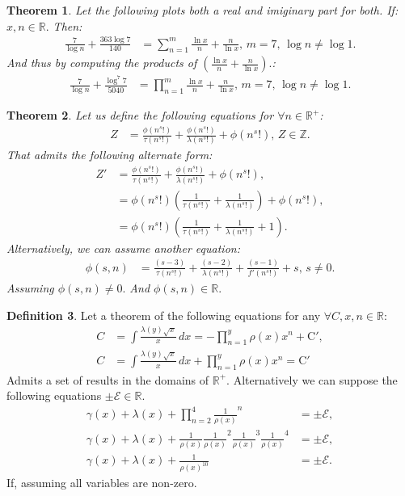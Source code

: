 \documentclass[10pt]{article}
\theoremstyle{plain}
\newtheorem{theorem}{Theorem}[section]
\theoremstyle{definition}
\newtheorem{definition}[theorem]{Definition}
\theoremstyle{remark}
\begin{document}
\begin{theorem}
	Let the following plots both a real and imiginary part for both. If: $x, n \in \mathbb{R}.$ Then:
	\begin{align*}
		\frac{7}{\log n} + \frac{363 \log 7}{140} &= \sum_{n=1}^{m} \frac{\ln x}{n} + \frac{n}{\ln x}, \, m = 7, \, \log n \neq \log 1.
	\end{align*}
	And thus by computing the products of $(\frac{\ln x}{n} + \frac{n}{\ln x}).$:
	\begin{align*}
		\frac{7}{\log n} + \frac{\log^{7} 7}{5040} &= \prod_{n=1}^{m} \frac{\ln x}{n} + \frac{n}{\ln x}, \, m = 7, \, \log n \neq \log 1.
	\end{align*}
\end{theorem}

\begin{theorem}
	Let us define the following equations for $\forall n \in \mathbb{R}^{+}$:
	\begin{align*}
		Z &= \frac{\phi(n^{s}!)}{\tau(n^{s}!)} + \frac{\phi(n^{s}!)}{\lambda(n^{s}!)} + \phi(n^{s}!), \, Z \in \mathbb{Z}.
	\end{align*}
	That admits the following alternate form:
	\begin{align*}
		Z' &= \frac{\phi(n^{s}!)}{\tau(n^{s}!)} + \frac{\phi(n^{s}!)}{\lambda(n^{s}!)} + \phi(n^{s}!),\\
		&= \phi(n^{s}!)(\frac{1}{\tau(n^{s}!)} + \frac{1}{\lambda(n^{s}!)}) + \phi(n^{s}!),\\
		&= \phi(n^{s}!)(\frac{1}{\tau(n^{s}!)} + \frac{1}{\lambda(n^{s}!)} + 1).
	\end{align*}
	Alternatively, we can assume another equation:
	\begin{align*}
		\phi(s, n) &= \frac{(s-3)}{\tau(n^{s}!)} + \frac{(s-2)}{\lambda(n^{s}!)} + \frac{(s-1)}{f'(n^{s}!)} + s, \, s \neq 0.
	\end{align*}
	Assuming $\phi(s, n) \neq 0.$ And $\phi(s, n) \in \mathbb{R}.$
\end{theorem}

\begin{definition}
	Let a theorem of the following equations for any $\forall C, x, n \in \mathbb{R}$:
	\begin{align*}
		C &= \int \frac{\lambda(y) \sqrt{x}}{x} \, dx = - \prod_{n=1}^{y}\rho(x) x^{n} + \mathrm{C}',\\
		C &= \int \frac{\lambda(y) \sqrt{x}}{x} \, dx + \prod_{n=1}^{y}\rho(x) x^{n} = \mathrm{C}'
	\end{align*}
	Admits a set of results in the domains of $\mathbb{R}^{+}$. Alternatively we can suppose the following equations $\pm \mathcal{E} \in \mathbb{R}.$
	\begin{align*}
		\gamma(x)+\lambda(x) + \prod_{n=2}^{4}\frac{1}{\rho(x)}^{n} &= \pm \mathrm{\mathcal{E}},\\
		\gamma(x)+\lambda(x) + \frac{1}{\rho(x)} \frac{1}{\rho(x)}^{2} \frac{1}{\rho(x)}^{3} \frac{1}{\rho(x)}^{4} &= \pm \mathrm{\mathcal{E}},\\
		\gamma(x)+\lambda(x) + \frac{1}{\rho(x)^{10}} &= \pm \mathrm{\mathcal{E}}.
	\end{align*}
	If, assuming all variables are non-zero.
\end{definition}
\end{document}
